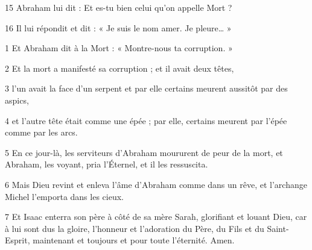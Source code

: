 \par 15 Abraham lui dit : Et es-tu bien celui qu'on appelle Mort ?

\par 16 Il lui répondit et dit : « Je suis le nom amer. Je pleure… »


\par 1 Et Abraham dit à la Mort : « Montre-nous ta corruption. »

\par 2 Et la mort a manifesté sa corruption ; et il avait deux têtes,

\par 3 l'un avait la face d'un serpent et par elle certains meurent aussitôt par des aspics,

\par 4 et l'autre tête était comme une épée ; par elle, certains meurent par l'épée comme par les arcs.

\par 5 En ce jour-là, les serviteurs d'Abraham moururent de peur de la mort, et Abraham, les voyant, pria l'Éternel, et il les ressuscita.

\par 6 Mais Dieu revint et enleva l'âme d'Abraham comme dans un rêve, et l'archange Michel l'emporta dans les cieux.

\par 7 Et Isaac enterra son père à côté de sa mère Sarah, glorifiant et louant Dieu, car à lui sont dus la gloire, l'honneur et l'adoration du Père, du Fils et du Saint-Esprit, maintenant et toujours et pour toute l'éternité. Amen.

